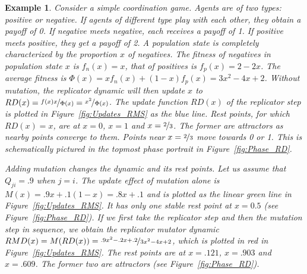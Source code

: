 \documentclass[a4paper, 11pt]{article}
\theoremstyle{Satz}
\newtheorem{example}{Example}
\begin{document}
\begin{example}
  Consider a simple coordination game. Agents are of two types: positive or negative. If
  agents of different type play with each other, they obtain a payoff of 0. If negative meets
  negative, each receives a payoff of 1. If positive meets positive, they get a payoff of 2. A
  population state is completely characterized by the proportion $x$ of negatives. The fitness
  of negatives in population state $x$ is $f_n(x) = x$, that of positives is $f_p(x) = 2-2x$.
  The average fitness is $\Phi(x) = x f_n(x) + (1-x) f_p(x) = 3x^2 - 4x + 2$. Without mutation,
  the replicator dynamic will then update $x$ to $RD(x) = \nicefrac{f(x)x}{\Phi(x)} = \nicefrac{x^2}{\Phi(x)}$. The update
  function $RD(x)$ of the replicator step is plotted in Figure~\ref{fig:Updates_RMS} as the
  blue line. Rest points, for which $RD(x)=x$, are at $x=0$, $x=1$ and $x= \nicefrac{2}{3}$.
  The former are attractors as nearby points converge to them. Points near $x=\nicefrac{2}{3}$
  move towards 0 or 1. This is schematically pictured in the topmost phase portrait in
  Figure~\ref{fig:Phase_RD}.

  Adding mutation changes the dynamic and its rest points. Let us assume that $Q_{ji} = .9$
  when $j=i$. The update effect of mutation alone is $M(x) = .9 x + .1 (1-x) = .8x + .1$ and is
  plotted as the linear green line in Figure~\ref{fig:Updates_RMS}. It has only one stable rest
  point at $x = 0.5$ (see Figure~\ref{fig:Phase_RD}). If we first take the replicator step and
  then the mutation step in sequence, we obtain the replicator mutator dynamic
  $RMD(x) = M(RD(x)) = \nicefrac{.9x^2 - .2x +.2}{3x^2 - 4x + 2}$, which is plotted in red in
  Figure~\ref{fig:Updates_RMS}. The rest points are at $x=.121$, $x=.903$ and $x=.609$. The
  former two are attractors (see Figure~\ref{fig:Phase_RD}).
\end{example}
\end{document}
